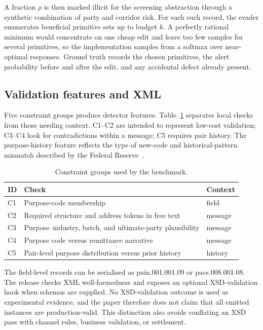 \documentclass[conference]{IEEEtran}
\begin{document}
A fraction $\rho$ is then marked illicit for the screening abstraction through
a synthetic combination of party and corridor risk. For each such record, the
evader enumerates beneficial primitive sets up to budget $k$. A perfectly
rational minimum would concentrate on one cheap edit and leave too few samples
for several primitives, so the implementation samples from a softmax over
near-optimal responses. Ground truth records the chosen primitives, the alert
probability before and after the edit, and any accidental defect already
present.

\subsection{Validation features and XML}
Five constraint groups produce detector features. Table~\ref{tab:constraints}
separates local checks from those needing context. C1--C2 are intended to
represent low-cost validation; C3--C4 look for contradictions within a
message; C5 requires pair history. The purpose-history feature reflects the
type of new-code and historical-pattern mismatch described by the Federal
Reserve~\cite{frb2026}.

\begin{table}[!t]
\caption{Constraint groups used by the benchmark.}
\label{tab:constraints}
\centering
\scriptsize
\begin{tabularx}{\columnwidth}{@{}lXl@{}}
\toprule
ID & Check & Context \\
\midrule
C1 & Purpose-code membership & field \\
C2 & Required structure and address tokens in free text & message \\
C3 & Purpose--industry, batch, and ultimate-party plausibility & message \\
C4 & Purpose code versus remittance narrative & message \\
C5 & Pair-level purpose distribution versus prior history & history \\
\bottomrule
\end{tabularx}
\end{table}

The field-level records can be serialised as pain.001.001.09 or
pacs.008.001.08. The release checks XML well-formedness and exposes an optional
XSD-validation hook when schemas are supplied. No XSD-validation outcome is
used as experimental evidence, and the paper therefore does not claim that all
emitted instances are production-valid. This distinction also avoids
conflating an XSD pass with channel rules, business validation, or settlement.
\end{document}
